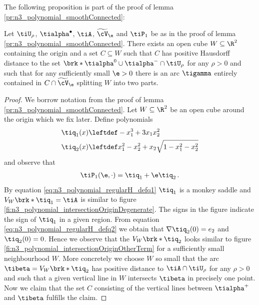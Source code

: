 The following proposition is part of the proof of lemma \ref{pr:n3_polynomial_smoothConnected}:
\begin{proposition}\label{pr:n3_polynomial_regularH}
  Let $\tiU_\rho$, $\tialpha^\bullet$, $\tiA$, $\widetilde{\cV}_\e$ and $\tiP_1$ be as in the proof of lemma \ref{pr:n3_polynomial_smoothConnected}.
  There exists an open cube $W\subseteq\R^2$ containing the origin and a set 
  $C\subseteq W$ such that $C$ has positive Hausdorff distance to the set
  $\brk*{\tialpha^0\cup\tialpha^-}\cap \tiU_\rho$ for any $\rho>0$
  and such that for any sufficiently small $\e>0$ there is an arc $\tigamma$
  entirely contained in $C\cap\widetilde{\cV}_\e$ splitting $W$ into two parts.
\end{proposition}
\begin{proof}
  We borrow notation from the proof of lemma \ref{pr:n3_polynomial_smoothConnected}.
  Let $W\subseteq\R^2$ be an open cube around the origin which we fix later.
  Define polynomials
  \begin{align}
    \tiq_1(x)&\leftdef-x_1^3+3x_1x_2^2\label{eq:n3_polynomial_regularH_defq1} \\ 
    \tiq_2(x)&\leftdef x_1^2-x_2^2+x_2\sqrt{1-x_1^2-x_2^2} \label{eq:n3_polynomial_regularH_defq2}
  \end{align}
  and observe that
  \begin{align}
    \tiP_1(\e,\cdot)=\tiq_1+\e\tiq_2\,.\label{eq:n3_polynomial_regularH_relTiP}
  \end{align}
  By equation \eqref{eq:n3_polynomial_regularH_defq1} $\tiq_1$ is a monkey saddle
  and $V_W\brk*{\tiq_1}=\tiA$ is
  similar to figure \ref{fi:n3_polynomial_intersectionOriginDegenerate}.
  The signs in the figure indicate the sign of $\tiq_1$ in a given region.
  From equation \eqref{eq:n3_polynomial_regularH_defq2}
  we obtain that $\nabla \tiq_2(0)=e_2$ and $\tiq_2(0)=0$.
  Hence we observe that the $V_W\brk*{\tiq_2}$ looks similar to figure \ref{fi:n3_polynomial_intersectionOriginOtherTerm}
  for a sufficiently small neighbourhood $W$.
  More concretely we choose $W$ so small that the arc $\tibeta=V_W\brk*{\tiq_2}$ has positive distance to $\tiA\cap \tiU_\rho$ for
  any $\rho>0$ and such that a given vertical line in $W$ intersects $\tibeta$ in precisely one point.
  Now we claim that the set $C$ consisting of the vertical lines between $\tialpha^+$
  and $\tibeta$ fulfills the claim.


\end{proof}
